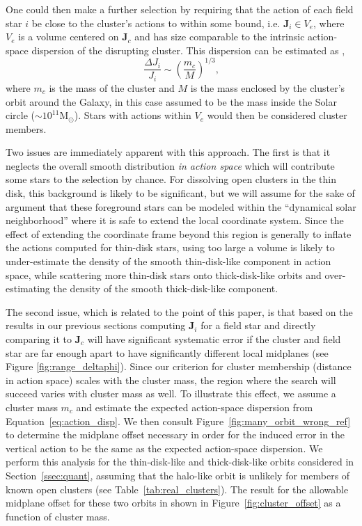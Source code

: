 \documentclass[twocolumn]{aastex62}
\newcommand{\Msun}{\ensuremath{\text{M}_\odot}}
\newcommand{\beq}{\begin{equation}}
\newcommand{\eeq}{\end{equation}}
\begin{document}
One could then make a further selection by requiring that the action of each
field star $i$ be close to the cluster's actions to within some bound, i.e.
$\bm{J}_i \in V_e$, where $V_e$ is a volume centered on $\bm{J}_c$ and has size
comparable to the intrinsic action-space dispersion of the disrupting
cluster. This dispersion can be estimated as \citep[Section~8.3.3][]{2008gady.book.....B},
\beq \label{eq:action_disp}
\frac{\Delta J_i}{J_i} \sim \left(\frac{m_c}{M}\right)^{1/3}\text{,}
\eeq
where $m_c$ is the mass of the cluster and $M$ is the mass enclosed by the
cluster's orbit around the Galaxy, in this case assumed to be the mass inside
the Solar circle ($\sim 10^{11}\Msun$). Stars with actions within $V_e$ would
then be considered cluster members.

Two issues are immediately apparent with this approach. The first is that it
neglects the overall smooth distribution \emph{in action space} which will
contribute some stars to the selection by chance. For dissolving open clusters
in the thin disk, this background is likely to be significant, but we will
assume for the sake of argument that these foreground stars can be modeled
within the ``dynamical solar neighborhood'' where it is safe to extend the
local coordinate system. Since the effect of extending the coordinate frame
beyond this region is generally to inflate the actions computed for thin-disk
stars, using too large a volume is likely to under-estimate the density of the
smooth thin-disk-like component in action space, while scattering more
thin-disk stars onto thick-disk-like orbits and over-estimating the density of
the smooth thick-disk-like component.

The second issue, which is related to the point of this paper, is that based
on the results in our previous sections computing $\bm{J}_i$ for a field star
and directly comparing it to  $\bm{J}_c$ will have significant systematic
error if the cluster and field star are far enough apart to have significantly
different local midplanes (see Figure \ref{fig:range_deltaphi}). Since our
criterion for cluster membership (distance in action space) scales with the
cluster mass, the region where the search will succeed varies with cluster
mass as well. To illustrate this effect, we assume a cluster mass $m_c$ and
estimate the expected action-space dispersion from
Equation~\ref{eq:action_disp}. We then consult
Figure~\ref{fig:many_orbit_wrong_ref} to determine the midplane offset
necessary in order for the induced error in the vertical action to be the same
as the expected action-space dispersion. We perform this analysis for the
thin-disk-like and thick-disk-like orbits considered in
Section~\ref{ssec:quant}, assuming that the halo-like orbit is unlikely for
members of known open clusters (see Table~\ref{tab:real_clusters}). The result
for the allowable midplane offset for these two orbits in shown in
Figure~\ref{fig:cluster_offset} as a function of cluster mass.
\end{document}
